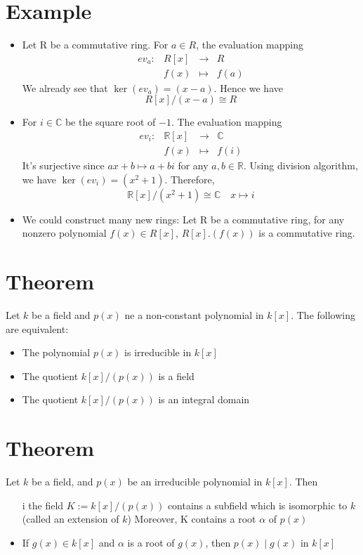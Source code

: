 \documentclass{book}
\begin{document}
\section{Example}
\begin{itemize}
	\item Let R be a commutative ring. For $a\in R$, the evaluation mapping $$\begin{aligned}
		ev_a:&R[x]&\to &R\\ &f(x)&\mapsto&f(a)
	\end{aligned}$$We already see that $\ker(ev_a)=(x-a).$ Hence we have$$R[x]/(x-a)\cong R$$
	\item For $i\in \mathbb C$ be the square root of $-1$. The evaluation mapping $$\begin{aligned}
		ev_i:&\mathbb R[x]&\to &\mathbb C\\ &f(x)&\mapsto&f(i)
	\end{aligned}$$
	It's surjective since $ax+b\mapsto a+bi$ for any $a,b\in \mathbb R$. Using division algorithm, we have $\ker(ev_i)=(x^2+1)$. Therefore,$$\mathbb R[x]/(x^2+1)\cong\mathbb C\quad x\mapsto i$$
	\item We could construct many new rings: Let R be a commutative ring, for any nonzero polynomial $f(x)\in R[x]$, $R[x].(f(x))$ is a commutative ring.
\end{itemize}
\section{Theorem}
Let $k$ be a field and $p(x)$ ne a non-constant polynomial in $k[x]$. The following are equivalent:
\begin{itemize}
	\item The polynomial $p(x)$ is irreducible in $k[x]$
	\item The quotient $k[x]/(p(x))$ is a field
	\item The quotient $k[x]/(p(x))$ is an integral domain
\end{itemize}
\section{Theorem}
Let $k$ be a field, and $p(x)$ be an irreducible polynomial in $k[x]$. Then \begin{itemize}
	\item [i]the field $K:=k[x]/(p(x))$ contains a subfield which is isomorphic to $k$ (called an extension of $k$) Moreover, K contains a root $\alpha$ of $p(x)$
	\item If $g(x)\in k[x]$ and $\alpha$ is a root of $g(x)$, then $p(x)\mid g(x)$ in $k[x]$
\end{itemize}
\end{document}
